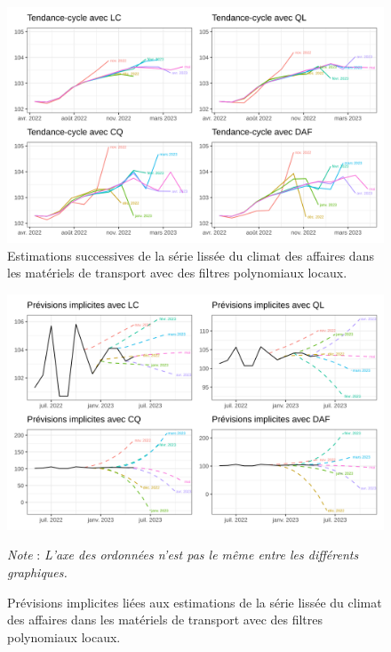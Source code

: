 \documentclass[
  12pt,
  a4paper,french]{article}
\newcommand\1{\mathds{1}}
\begin{document}
\begin{figure}

{\centering \includegraphics[width=1\linewidth]{img/ex/lp_es} 

}

\caption[Estimations successives de la série lissée du climat des affaires dans les matériels de transport avec des filtres polynomiaux locaux]{Estimations successives de la série lissée du climat des affaires dans les matériels de transport avec des filtres polynomiaux locaux.}\label{fig:graphs-ex-lp-es}

\footnotesize
\normalsize\end{figure}

\begin{figure}

{\centering \includegraphics[width=1\linewidth]{img/ex/lp_if} 

}

\caption[Prévisions implicites liées aux estimations de la série lissée du climat des affaires dans les matériels de transport avec des filtres polynomiaux locaux]{Prévisions implicites liées aux estimations de la série lissée du climat des affaires dans les matériels de transport avec des filtres polynomiaux locaux.}\label{fig:graphs-ex-lp-if}

\footnotesize


\emph{Note} : \emph{L'axe des ordonnées n'est pas le même entre les différents graphiques.}
\normalsize\end{figure}
\end{document}

